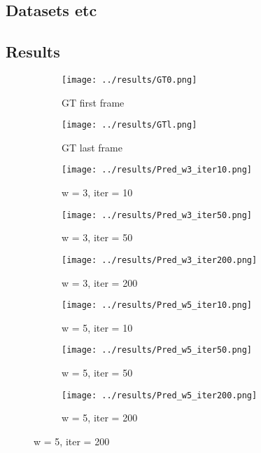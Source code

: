 \documentclass{article}
\begin{document}
\subsection{Datasets etc}
\subsection{Results}\label{results_section}

\begin{figure}
\label{results}
    \centering
    
	\begin{subfigure}[b]{0.3\textwidth}
		\centering    
        \texttt{[image: ../results/GT0.png]}
        \caption{GT first frame}
    \end{subfigure}
    \begin{subfigure}[b]{0.3\textwidth}
        \centering
        \texttt{[image: ../results/GTl.png]}
        \caption{GT last frame}
    \end{subfigure}%

    \begin{subfigure}[t]{0.3\textwidth}
        \centering
        \texttt{[image: ../results/Pred\_w3\_iter10.png]}
        \caption{w = 3, iter = 10}
    \end{subfigure}
    \begin{subfigure}[t]{0.3\textwidth}
        \centering
        \texttt{[image: ../results/Pred\_w3\_iter50.png]}
        \caption{w = 3, iter = 50}
    \end{subfigure}
    \begin{subfigure}[t]{0.3\textwidth}
        \centering
        \texttt{[image: ../results/Pred\_w3\_iter200.png]}
        \caption{w = 3, iter = 200}
    \end{subfigure}
   
    \begin{subfigure}[t]{0.3\textwidth}
        \centering
        \texttt{[image: ../results/Pred\_w5\_iter10.png]}
        \caption{w = 5, iter = 10}
    \end{subfigure}
    \begin{subfigure}[t]{0.3\textwidth}
        \centering
        \texttt{[image: ../results/Pred\_w5\_iter50.png]}
        \caption{w = 5, iter = 50}
    \end{subfigure}
    \begin{subfigure}[t]{0.3\textwidth}
        \centering
        \texttt{[image: ../results/Pred\_w5\_iter200.png]}
        \caption{w = 5, iter = 200}
    \end{subfigure}


\end{figure}
\end{document}
